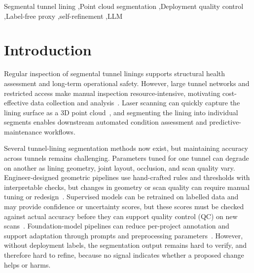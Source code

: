 \documentclass[a4paper,fleqn]{cas-dc}
\begin{document}
{%
\begin{keywords}
Segmental tunnel lining \sep Point cloud segmentation \sep Deployment quality control \sep Label-free proxy \sep self-refinement \sep LLM
\end{keywords}
\date{\today}

\maketitle

\smallskip

\section{Introduction}
\label{sec:intro}

Regular inspection of segmental tunnel linings supports structural health assessment and long-term operational safety. However, large tunnel networks and restricted access make manual inspection resource-intensive, motivating cost-effective data collection and analysis~\cite{attard2018,montero2015,strauss2020sensing}. Laser scanning can quickly capture the lining surface as a 3D point cloud~\cite{huang2021bim,sjolander2023towards,weidner2024generalized}, and segmenting the lining into individual segments enables downstream automated condition assessment and predictive-maintenance workflows.

Several tunnel-lining segmentation methods now exist, but maintaining accuracy across tunnels remains challenging. Parameters tuned for one tunnel can degrade on another as lining geometry, joint layout, occlusion, and scan quality vary. Engineer-designed geometric pipelines use hand-crafted rules and thresholds with interpretable checks, but changes in geometry or scan quality can require manual tuning or redesign~\cite{huang2021bim,weidner2024generalized,wang2025automated}. Supervised models can be retrained on labelled data and may provide confidence or uncertainty scores, but these scores must be checked against actual accuracy before they can support quality control (QC) on new scans~\cite{su2024review,cha2024deep}. Foundation-model pipelines can reduce per-project annotation and support adaptation through prompts and preprocessing parameters~\cite{bommasani2021foundation,kirillov2023sam,ye2024sam}. However, without deployment labels, the segmentation output remains hard to verify, and therefore hard to refine, because no signal indicates whether a proposed change helps or harms.

}
\end{document}
